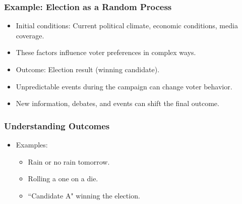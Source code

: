 \documentclass[handout]{beamer} %
\begin{document}

\begin{frame}
    \frametitle{Example: Election as a Random Process}
    \begin{itemize}
        \item Initial conditions: Current political climate, economic conditions, media coverage.
        \pause
        \item These factors influence voter preferences in complex ways.
        \pause
        \item Outcome: Election result (winning candidate).
        \pause
        \item Unpredictable events during the campaign can change voter behavior.
        \pause
        \item New information, debates, and events can shift the final outcome.
    \end{itemize}
\end{frame}

\begin{frame}

\frametitle{Understanding Outcomes}
    \begin{itemize}
        \item Examples:
        \begin{itemize}
            \item Rain or no rain tomorrow.
            \pause
            \item Rolling a one on a die.
            \pause
            \item ``Candidate A" winning the election.
        \end{itemize}
    \end{itemize}
\end{frame}
\end{document}
